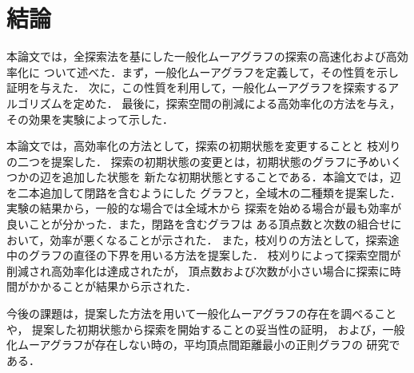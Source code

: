 
\chapter{結論}
本論文では，全探索法を基にした一般化ムーアグラフの探索の高速化および高効率化に
ついて述べた．まず，一般化ムーアグラフを定義して，その性質を示し証明を与えた．
次に，この性質を利用して，一般化ムーアグラフを探索するアルゴリズムを定めた．
最後に，探索空間の削減による高効率化の方法を与え，その効果を実験によって示した．

本論文では，高効率化の方法として，探索の初期状態を変更することと
枝刈りの二つを提案した．
探索の初期状態の変更とは，初期状態のグラフに予めいくつかの辺を追加した状態を
新たな初期状態とすることである．本論文では，辺を二本追加して閉路を含むようにした
グラフと，全域木の二種類を提案した．実験の結果から，一般的な場合では全域木から
探索を始める場合が最も効率が良いことが分かった．また，閉路を含むグラフは
ある頂点数と次数の組合せにおいて，効率が悪くなることが示された．
また，枝刈りの方法として，探索途中のグラフの直径の下界を用いる方法を提案した．
枝刈りによって探索空間が削減され高効率化は達成されたが，
頂点数および次数が小さい場合に探索に時間がかかることが結果から示された．

今後の課題は，提案した方法を用いて一般化ムーアグラフの存在を調べることや，
提案した初期状態から探索を開始することの妥当性の証明，
および，一般化ムーアグラフが存在しない時の，平均頂点間距離最小の正則グラフの
研究である．
